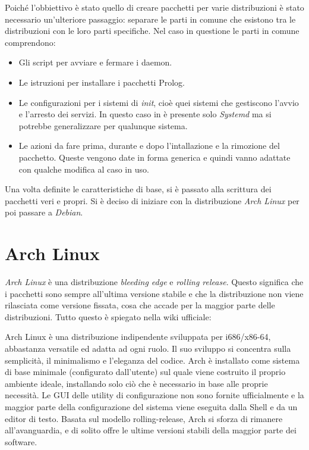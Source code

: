 \documentclass[10pt,titlepage,twoside,a4paper]{report}
\begin{document}
Poiché l'obbiettivo è stato quello di creare pacchetti per varie 
distribuzioni è stato necessario un'ulteriore passaggio: separare le parti in 
comune che esistono tra le distribuzioni con le loro parti specifiche. Nel 
caso in questione le parti in comune comprendono:
\begin{itemize}
    \item Gli script per avviare e fermare i daemon.
    \item Le istruzioni per installare i pacchetti Prolog.
    \item Le configurazioni per i sistemi di \emph{init}, cioè quei sistemi 
che gestiscono l'avvio e l'arresto dei servizi. In questo caso in è 
presente solo \emph{Systemd} ma si potrebbe generalizzare per qualunque 
sistema.
    \item Le azioni da fare prima, durante e dopo l'intallazione e la rimozione 
del pacchetto. Queste vengono date in forma generica e quindi vanno adattate 
con qualche modifica al caso in uso.
\end{itemize}

Una volta definite le caratteristiche di base, si è passato alla scrittura dei
pacchetti veri e propri. Si è deciso di iniziare con la
distribuzione \emph{Arch Linux} per poi passare a \emph{Debian}.


\section{Arch Linux}
\emph{Arch Linux} è una distribuzione \emph{bleeding edge} e \emph{rolling 
release}. Questo significa che i pacchetti sono sempre all'ultima versione 
stabile e che la distribuzione non viene rilasciata come versione fissata, 
cosa che accade per la maggior parte delle distribuzioni. Tutto questo è 
spiegato nella wiki ufficiale\cite{archLinux}:
\begin{displayquote}
Arch Linux è una distribuzione indipendente sviluppata per i686/x86-64, 
abbastanza versatile ed adatta ad ogni ruolo. Il suo sviluppo si concentra 
sulla semplicità, il minimalismo e l'eleganza del codice. Arch è installato 
come sistema di base minimale (configurato dall'utente) sul quale viene 
costruito il proprio ambiente ideale, installando solo ciò che è necessario 
in base alle proprie necessità. Le GUI delle utility di configurazione non 
sono fornite ufficialmente e la maggior parte della configurazione del sistema viene 
eseguita dalla Shell e da un editor di testo. Basata sul modello 
rolling-release, Arch si sforza di rimanere all'avanguardia, e di solito offre 
le ultime versioni stabili della maggior parte dei software.
\end{displayquote}
\end{document}
